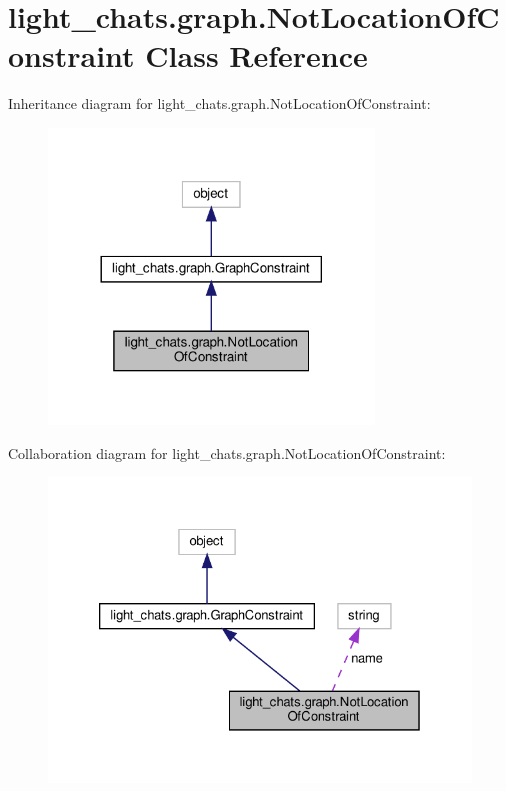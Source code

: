 \hypertarget{classlight__chats_1_1graph_1_1NotLocationOfConstraint}{}\section{light\+\_\+chats.\+graph.\+Not\+Location\+Of\+Constraint Class Reference}
\label{classlight__chats_1_1graph_1_1NotLocationOfConstraint}


Inheritance diagram for light\+\_\+chats.\+graph.\+Not\+Location\+Of\+Constraint\+:
\nopagebreak
\begin{figure}[H]
\begin{center}
\leavevmode
\includegraphics[width=245pt]{classlight__chats_1_1graph_1_1NotLocationOfConstraint__inherit__graph}
\end{center}
\end{figure}


Collaboration diagram for light\+\_\+chats.\+graph.\+Not\+Location\+Of\+Constraint\+:
\nopagebreak
\begin{figure}[H]
\begin{center}
\leavevmode
\includegraphics[width=326pt]{classlight__chats_1_1graph_1_1NotLocationOfConstraint__coll__graph}
\end{center}
\end{figure}
